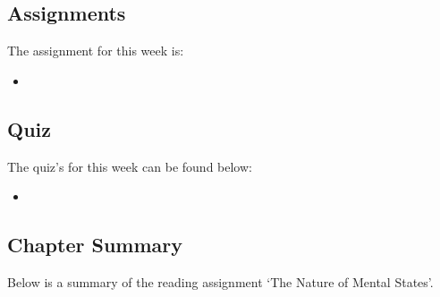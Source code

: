 \subsection{Assignments}

The assignment for this week is:

\begin{itemize}
    \item {}
\end{itemize}

\subsection{Quiz}

The quiz's for this week can be found below:

\begin{itemize}
    \item {}
\end{itemize}

\subsection{Chapter Summary}

Below is a summary of the reading assignment `The Nature of Mental States'.

